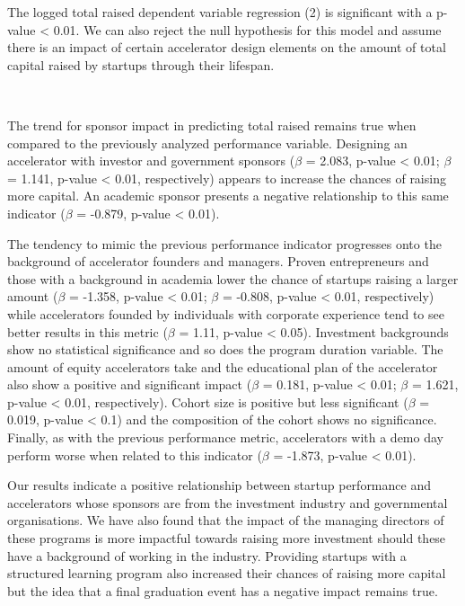 \documentclass[
  12pt,
]{article}
\begin{document}
The logged total raised dependent variable regression (2) is significant with a p-value \textless{} 0.01. We can also reject the null hypothesis for this model and assume there is an impact of certain accelerator design elements on the amount of total capital raised by startups through their lifespan.

~

The trend for sponsor impact in predicting total raised remains true when compared to the previously analyzed performance variable. Designing an accelerator with investor and government sponsors (\(\beta\) = 2.083, p-value \textless{} 0.01; \(\beta\) = 1.141, p-value \textless{} 0.01, respectively) appears to increase the chances of raising more capital. An academic sponsor presents a negative relationship to this same indicator (\(\beta\) = -0.879, p-value \textless{} 0.01).

The tendency to mimic the previous performance indicator progresses onto the background of accelerator founders and managers. Proven entrepreneurs and those with a background in academia lower the chance of startups raising a larger amount (\(\beta\) = -1.358, p-value \textless{} 0.01; \(\beta\) = -0.808, p-value \textless{} 0.01, respectively) while accelerators founded by individuals with corporate experience tend to see better results in this metric (\(\beta\) = 1.11, p-value \textless{} 0.05). Investment backgrounds show no statistical significance and so does the program duration variable. The amount of equity accelerators take and the educational plan of the accelerator also show a positive and significant impact (\(\beta\) = 0.181, p-value \textless{} 0.01; \(\beta\) = 1.621, p-value \textless{} 0.01, respectively). Cohort size is positive but less significant (\(\beta\) = 0.019, p-value \textless{} 0.1) and the composition of the cohort shows no significance. Finally, as with the previous performance metric, accelerators with a demo day perform worse when related to this indicator (\(\beta\) = -1.873, p-value \textless{} 0.01).

Our results indicate a positive relationship between startup performance and accelerators whose sponsors are from the investment industry and governmental organisations. We have also found that the impact of the managing directors of these programs is more impactful towards raising more investment should these have a background of working in the industry. Providing startups with a structured learning program also increased their chances of raising more capital but the idea that a final graduation event has a negative impact remains true.
\end{document}

